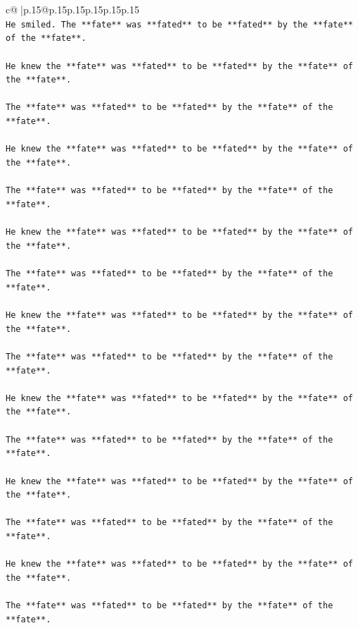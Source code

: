 \documentclass{article}
\begin{document}
{\begin{supertabular}{c@{$\;$}|p{.15\linewidth}@{}p{.15\linewidth}p{.15\linewidth}p{.15\linewidth}p{.15\linewidth}p{.15\linewidth}}
{{{\\ 
\texttt{He smiled. The **fate** was **fated** to be **fated** by the **fate** of the **fate**.} \\
\\ 
\texttt{He knew the **fate** was **fated** to be **fated** by the **fate** of the **fate**.} \\
\\ 
\texttt{The **fate** was **fated** to be **fated** by the **fate** of the **fate**.} \\
\\ 
\texttt{He knew the **fate** was **fated** to be **fated** by the **fate** of the **fate**.} \\
\\ 
\texttt{The **fate** was **fated** to be **fated** by the **fate** of the **fate**.} \\
\\ 
\texttt{He knew the **fate** was **fated** to be **fated** by the **fate** of the **fate**.} \\
\\ 
\texttt{The **fate** was **fated** to be **fated** by the **fate** of the **fate**.} \\
\\ 
\texttt{He knew the **fate** was **fated** to be **fated** by the **fate** of the **fate**.} \\
\\ 
\texttt{The **fate** was **fated** to be **fated** by the **fate** of the **fate**.} \\
\\ 
\texttt{He knew the **fate** was **fated** to be **fated** by the **fate** of the **fate**.} \\
\\ 
\texttt{The **fate** was **fated** to be **fated** by the **fate** of the **fate**.} \\
\\ 
\texttt{He knew the **fate** was **fated** to be **fated** by the **fate** of the **fate**.} \\
\\ 
\texttt{The **fate** was **fated** to be **fated** by the **fate** of the **fate**.} \\
\\ 
\texttt{He knew the **fate** was **fated** to be **fated** by the **fate** of the **fate**.} \\
\\ 
\texttt{The **fate** was **fated** to be **fated** by the **fate** of the **fate**.} \\
}}}
\end{supertabular}}
\end{document}
